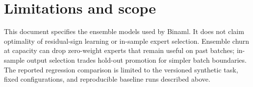 \documentclass[11pt]{article}
\begin{document}
\section{Limitations and scope}
This document specifies the ensemble models used by Binaml.  It does not
claim optimality of residual-sign learning or in-sample expert selection.
Ensemble churn at capacity can drop zero-weight experts that remain useful on
past batches; in-sample output selection trades hold-out promotion for simpler
batch boundaries.  The reported regression comparison is limited to the
versioned synthetic task, fixed configurations, and reproducible baseline runs
described above.
\end{document}
